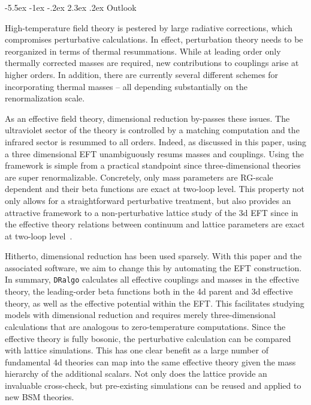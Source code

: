 \documentclass[11pt]{article}
\makeatletter
\def\dralgo{{\tt DRalgo}}
\renewcommand\section{\@startsection{section}{1}{\z@}%
  {-5.5ex \@plus -1ex \@minus -.2ex}%
  {2.3ex \@plus.2ex}%
  {\normalfont\large\bfseries}}
\makeatother
\begin{document}
%
\section{Outlook}
\label{sec:outlook}

High-temperature field theory is pestered by large radiative corrections,
which compromises perturbative calculations.
In effect, perturbation theory needs to be reorganized
in terms of thermal resummations.
While at leading order only thermally corrected masses are required,
new contributions to couplings arise at higher orders.
In addition, there are currently several different schemes for incorporating thermal masses --
all depending substantially on the renormalization scale.

As an effective field theory,
dimensional reduction by-passes these issues.
The ultraviolet sector of the theory is controlled by a matching computation and
the infrared sector is resummed to all orders.
Indeed, as discussed in this paper, using a three dimensional EFT unambiguously resums masses and couplings.
Using the framework is simple from a practical standpoint since
three-dimensional theories are super renormalizable.
Concretely,
only mass parameters are RG-scale dependent and
their beta functions are exact
at two-loop level.
This property not only allows for
a straightforward perturbative treatment,
but also provides
an attractive framework to a non-perturbative lattice study of
the 3d EFT
since in the effective theory relations between continuum and lattice parameters are exact
at two-loop level~\cite{Laine:1997dy}.

Hitherto, dimensional reduction has been used sparsely.
With this paper and the associated software,
we aim to change this by automating the EFT construction.
In summary, \dralgo{} calculates
all effective couplings and masses in the effective theory,
the leading-order beta functions both in the 4d parent and 3d effective theory,
as well as
the effective potential within the EFT.
This facilitates studying models with dimensional reduction and
requires merely 
three-dimensional calculations that are analogous to zero-temperature computations.
Since the effective theory is fully bosonic,
the perturbative calculation can be compared with lattice simulations.
This has one clear benefit as
a large number of fundamental 4d theories can map into the same effective theory
given the mass hierarchy of the additional scalars.
Not only does
the lattice provide an invaluable cross-check, but pre-existing simulations can be reused and applied to new BSM theories.
\end{document}
